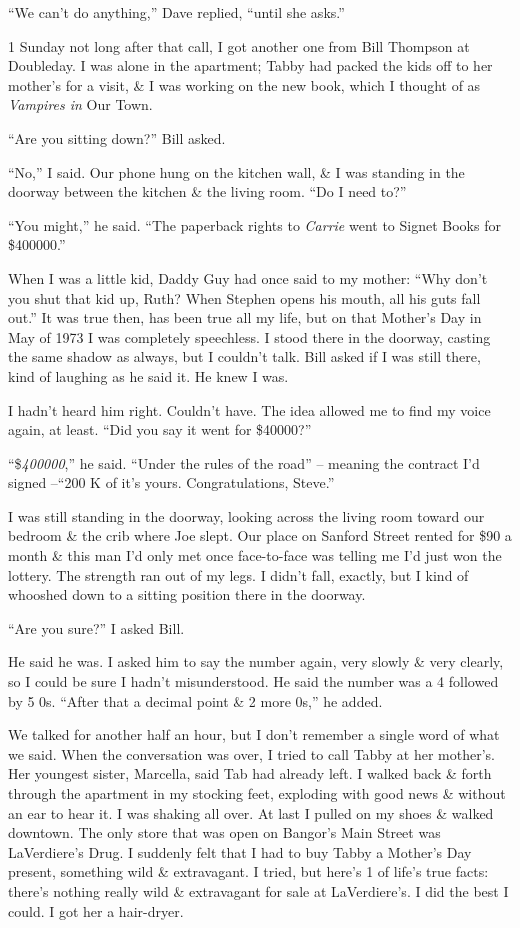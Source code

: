 \documentclass{article}
\numberwithin{equation}{section}
\begin{document}
``We can't do anything,'' Dave replied, ``until she asks.''

1 Sunday not long after that call, I got another one from Bill Thompson at Doubleday. I was alone in the apartment; Tabby had packed the kids off to her mother's for a visit, \& I was working on the new book, which I thought of as \textit{Vampires in} Our Town.

``Are you sitting down?'' Bill asked.

``No,'' I said. Our phone hung on the kitchen wall, \& I was standing in the doorway between the kitchen \& the living room. ``Do I need to?''

``You might,'' he said. ``The paperback rights to \textit{Carrie} went to Signet Books for \$400000.''

When I was a little kid, Daddy Guy had once said to my mother: ``Why don't you shut that kid up, Ruth? When Stephen opens his mouth, all his guts fall out.'' It was true then, has been true all my life, but on that Mother's Day in May of 1973 I was completely speechless. I stood there in the doorway, casting the same shadow as always, but I couldn't talk. Bill asked if I was still there, kind of laughing as he said it. He knew I was.

I hadn't heard him right. Couldn't have. The idea allowed me to find my voice again, at least. ``Did you say it went for \$40000?''

``\$\textit{400000},'' he said. ``Under the rules of the road'' -- meaning the contract I'd signed --``200 K of it's yours. Congratulations, Steve.''

I was still standing in the doorway, looking across the living room toward our bedroom \& the crib where Joe slept. Our place on Sanford Street rented for \$90 a month \& this man I'd only met once face-to-face was telling me I'd just won the lottery. The strength ran out of my legs. I didn't fall, exactly, but I kind of whooshed down to a sitting position there in the doorway.

``Are you sure?'' I asked Bill.

He said he was. I asked him to say the number again, very slowly \& very clearly, so I could be sure I hadn't misunderstood. He said the number was a 4 followed by 5 0s. ``After that a decimal point \& 2 more 0s,'' he added.

We talked for another half an hour, but I don't remember a single word of what we said. When the conversation was over, I tried to call Tabby at her mother's. Her youngest sister, Marcella, said Tab had already left. I walked back \& forth through the apartment in my stocking feet, exploding with good news \& without an ear to hear it. I was shaking all over. At last I pulled on my shoes \& walked downtown. The only store that was open on Bangor's Main Street was LaVerdiere's Drug. I suddenly felt that I had to buy Tabby a Mother's Day present, something wild \& extravagant. I tried, but here's 1 of life's true facts: there's nothing really wild \& extravagant for sale at LaVerdiere's. I did the best I could. I got her a hair-dryer.
\end{document}
